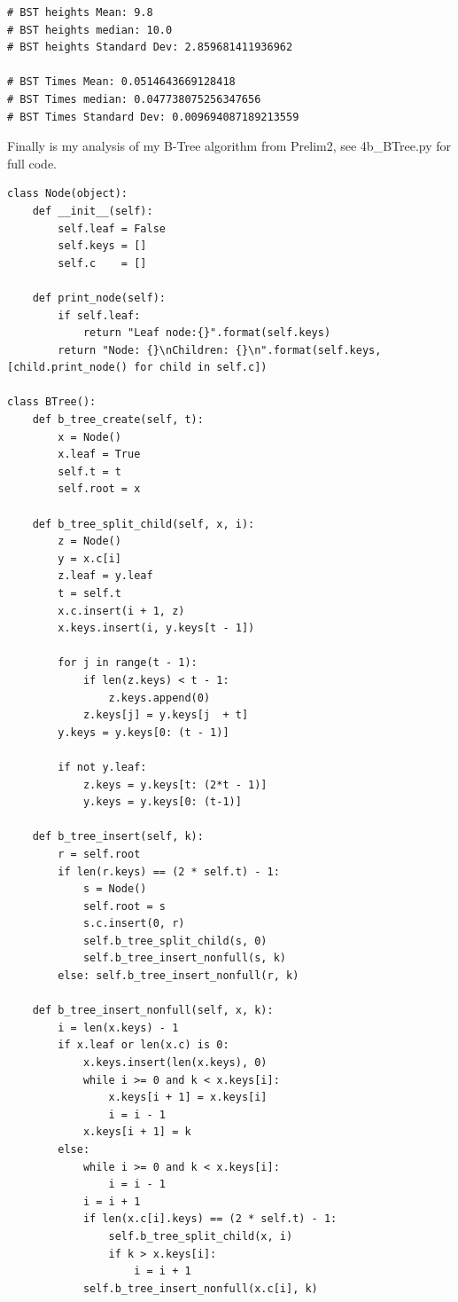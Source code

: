 \documentclass{article}
\begin{document}
\begin{enumerate}
\begin{enumerate}
\begin{lstlisting}
# BST heights Mean: 9.8
# BST heights median: 10.0
# BST heights Standard Dev: 2.859681411936962

# BST Times Mean: 0.0514643669128418
# BST Times median: 0.047738075256347656
# BST Times Standard Dev: 0.009694087189213559
    \end{lstlisting}

    Finally is my analysis of my B-Tree algorithm from Prelim2, see 4b\_BTree.py for full code.

    \begin{lstlisting}
class Node(object):
    def __init__(self):
        self.leaf = False
        self.keys = []
        self.c    = []
        
    def print_node(self):
        if self.leaf:
            return "Leaf node:{}".format(self.keys)
        return "Node: {}\nChildren: {}\n".format(self.keys, [child.print_node() for child in self.c])

class BTree():
    def b_tree_create(self, t):
        x = Node()
        x.leaf = True
        self.t = t
        self.root = x
        
    def b_tree_split_child(self, x, i):
        z = Node()
        y = x.c[i]
        z.leaf = y.leaf
        t = self.t
        x.c.insert(i + 1, z)        
        x.keys.insert(i, y.keys[t - 1])  
        
        for j in range(t - 1):
            if len(z.keys) < t - 1:
                z.keys.append(0)
            z.keys[j] = y.keys[j  + t]
        y.keys = y.keys[0: (t - 1)]
        
        if not y.leaf:
            z.keys = y.keys[t: (2*t - 1)]
            y.keys = y.keys[0: (t-1)]

    def b_tree_insert(self, k):
        r = self.root
        if len(r.keys) == (2 * self.t) - 1:
            s = Node()
            self.root = s
            s.c.insert(0, r)
            self.b_tree_split_child(s, 0)  
            self.b_tree_insert_nonfull(s, k)
        else: self.b_tree_insert_nonfull(r, k)
    
    def b_tree_insert_nonfull(self, x, k):
        i = len(x.keys) - 1
        if x.leaf or len(x.c) is 0:
            x.keys.insert(len(x.keys), 0)
            while i >= 0 and k < x.keys[i]:
                x.keys[i + 1] = x.keys[i]
                i = i - 1
            x.keys[i + 1] = k
        else: 
            while i >= 0 and k < x.keys[i]:
                i = i - 1            
            i = i + 1
            if len(x.c[i].keys) == (2 * self.t) - 1:
                self.b_tree_split_child(x, i)
                if k > x.keys[i]:
                    i = i + 1
            self.b_tree_insert_nonfull(x.c[i], k) 
    

\end{lstlisting}
\end{enumerate}
\end{enumerate}
\end{document}
